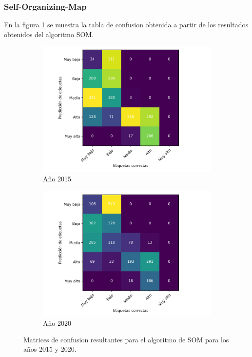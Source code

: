 \subsubsection{Self-Organizing-Map}

En la figura \ref{fig:som} se muestra la tabla de confusion obtenida a partir de los resultados obtenidos del algoritmo SOM.

\begin{figure}[H]
    \centering
    \begin{subfigure}{8.4cm}
        \includegraphics[width=1\linewidth]{Graphics/Data_2015/SOM_confusion_matrix.png}
        \caption{Año 2015}
    \end{subfigure}
    \begin{subfigure}{8.4cm}
        \includegraphics[width=1\linewidth]{Graphics/Data_2020/SOM_confusion_matrix.png}
        \caption{Año 2020}
    \end{subfigure}
    \caption{Matrices de confusion resultantes para el algoritmo de SOM para los años 2015 y 2020.}
    \label{fig:som}
\end{figure}